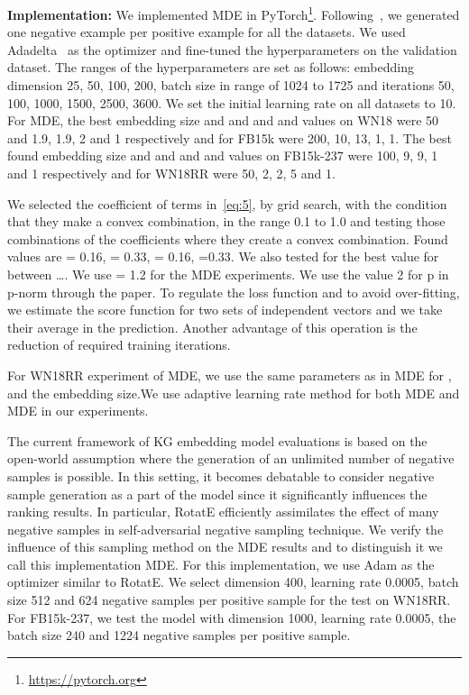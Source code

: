 \documentclass{ecai}
\begin{document}
\textbf{Implementation:}
We implemented MDE in PyTorch\footnote{\url{https://pytorch.org}}.  Following~\cite{bordes2011learning}, we generated one negative example per positive example for all the datasets. We used Adadelta~\cite{zeiler2012adadelta} as the optimizer and fine-tuned the hyperparameters on the validation dataset. The ranges of the hyperparameters are set as follows: embedding dimension 25, 50, 100, 200, batch size in range of 1024 to 1725 and iterations 50, 100, 1000, 1500, 2500, 3600. We set the initial learning rate on all datasets to 10. 
For MDE, the best embedding size and  and  and  and  values on WN18 were 50 and 1.9, 1.9, 2 and 1 respectively and for FB15k were 200, 10, 13, 1, 1. The best found embedding size and  and  and  and  values on FB15k-237 were 100, 9, 9, 1 and 1 respectively and for WN18RR were 50, 2, 2, 5 and 1. 

We selected the coefficient of terms in~\eqref{eq:5}, by grid search, with the condition that they make a convex combination, in the range 0.1 to 1.0 and testing those combinations of the coefficients where they create a convex combination. Found values are  = 0.16,  = 0.33,  = 0.16, =0.33. We also tested for the best value for  between \dots. We use  = 1.2 for the MDE experiments. We use the value 2 for p in p-norm through the paper. To regulate the loss function and to avoid over-fitting, we estimate the score function for two sets of independent vectors and we take their average in the prediction. Another advantage of this operation is the reduction of required training iterations. 

For WN18RR experiment of MDE, we use the same parameters as in MDE for ,  and the embedding size.We use adaptive learning rate method for both MDE and MDE in our experiments. 

The current framework of KG embedding model evaluations is based on the open-world assumption where the generation of an unlimited number of negative samples is possible. In this setting, it becomes debatable to consider negative sample generation as a part of the model since it significantly influences the ranking results.
In particular, RotatE efficiently assimilates the effect of many negative samples in self-adversarial negative sampling technique.
We verify the influence of this sampling method on the MDE results and to distinguish it we call this implementation MDE. For this implementation, we use Adam as the optimizer similar to RotatE. We select dimension 400, learning rate 0.0005, batch size 512 and 624 negative samples per positive sample for the test on WN18RR. For FB15k-237, we test the model with dimension 1000, learning rate 0.0005, the batch size 240 and 1224 negative samples per positive sample.
\end{document}

